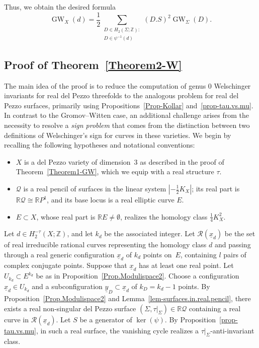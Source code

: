 \documentclass[11pt]{amsart}
\numberwithin{equation}{section}
\theoremstyle{definition}
\theoremstyle{plain}
\theoremstyle{remark}
\newcommand{\R}{\mathbb{R}}
\newcommand{\Z}{\mathbb{Z}}
\DeclareMathOperator{\GW}{GW}
\begin{document}
Thus, we obtain the desired formula
          $$\GW_X(d)=\frac{1}{2}\sum_{\substack{D\in H_2(\Sigma;\Z):\\
          D\in \psi^{-1}(d)}}(D.S)^2 \GW_{\Sigma}(D).$$


\subsection{Proof of Theorem~\ref{Theorem2-W}}
The main idea of the proof is to reduce the computation of genus $0$ Welschinger invariants for real del Pezzo threefolds to the analogous problem for real del Pezzo surfaces, primarily using Propositions~\ref{Prop-Kollar} and~\ref{prop-tau.vs.mu}.  In contrast to the Gromov--Witten case, an additional challenge arises from the necessity to resolve a \textit{sign problem} that comes  from the distinction between two definitions of Welschinger's sign for curves in these varieties. We begin by recalling the following hypotheses and notational conventions:
\begin{itemize}
    \item $X$ is a del Pezzo variety of dimension~$3$ as described in the proof of Theorem~\ref{Theorem1-GW}, which we equip with a real structure $\tau$.
    \item  $\mathcal{Q}$ is a real pencil of surfaces in the linear system $|-\frac{1}{2}K_X|$; its real part is $\R \mathcal{Q}\cong \R P^1$, and its base locus is a real elliptic curve $E$.
    \item  $E\subset X$, whose real part is $\R E\neq \emptyset$,  realizes the homology class $\frac{1}{4}K^2_X$.
\end{itemize}
Let $d\in H_2^{-\tau}(X;\Z)$, and let $k_d$ be the associated integer.
Let $\mathcal{R}(\underline{x}_d)$ be the set of real 
irreducible rational curves 
representing the homology class $d$ and passing through a real generic configuration $\underline{x}_d$ of $k_d$ points on~$E$, containing $l$ pairs of complex conjugate points. Suppose that $\underline{x}_d$ has at least one real point. Let $U_{k_d}\subset E^{k_d}$ be as in Proposition~\ref{Prop.Modulispace2}. Choose a configuration $\underline{x}_d\in U_{k_d}$ and a subconfiguration $\underline{y}_D\subset \underline{x}_d$ of $k_D=k_d-1$ points. By Proposition~\ref{Prop.Modulispace2} and Lemma~\ref{lem-surfaces.in.real.pencil}, there exists a real non-singular del Pezzo surface $(\Sigma,\tau|_{\Sigma}) \in \R \mathcal{Q}$  containing a real curve in $\mathcal{R}(\underline{x}_d)$. Let $S$ be a generator of $\ker(\psi)$. By Proposition~\ref{prop-tau.vs.mu}, in such a real surface, the vanishing cycle realizes a $\tau|_{\Sigma}$-anti-invariant class.
\end{document}
